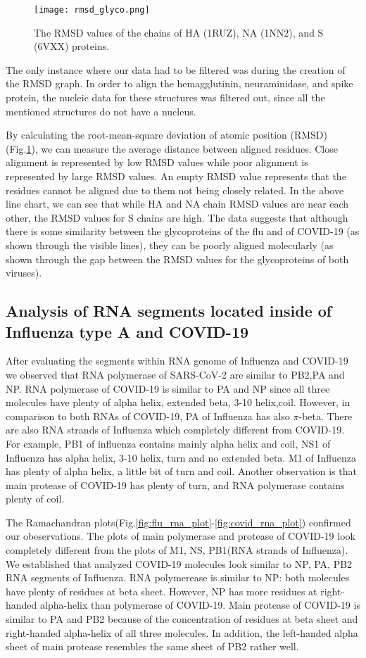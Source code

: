 \documentclass[conference]{IEEEtran}
\begin{document}
\begin{figure}[htbp]
    \centerline{\texttt{[image: rmsd\_glyco.png]}}
\caption{The RMSD values of the chains of HA (1RUZ), NA (1NN2), and S (6VXX) proteins.}
\label{fig:rmsd_glyco}
\end{figure}

The only instance where our data had to be filtered was during the creation of the RMSD graph. In order to align the hemagglutinin, neuraminidase, and spike protein, the nucleic data for these structures was filtered out, since all the mentioned structures do not have a nucleus.


By calculating the root-mean-square deviation of atomic position (RMSD) (Fig.\ref{fig:rmsd_glyco}), we can measure the average distance between aligned residues. Close alignment is represented by low RMSD values while poor alignment is represented by large RMSD values. An empty RMSD value represents that the residues cannot be aligned due to them not being closely related. In the above line chart, we can see that while HA and NA chain RMSD values are near each other, the RMSD values for S chains are high. The data suggests that although there is some similarity between the glycoproteins of the flu and of COVID-19 (as shown through the visible lines), they can be poorly aligned molecularly (as shown through the gap between the RMSD values for the glycoproteins of both viruses).

\subsection{Analysis of RNA segments located inside of Influenza type A and COVID-19}
After evaluating the segments within RNA genome of Influenza and COVID-19 we observed that  RNA polymerase of SARS-CoV-2 are similar to PB2,PA and NP. RNA polymerase of COVID-19 is similar to PA and NP since all three molecules have plenty of alpha helix, extended beta, 3-10 helix,coil. However, in comparison to both RNAs of COVID-19, PA of Influenza has also $\pi$-beta.   
There are also RNA strands of Influenza which completely different from COVID-19. For example, PB1 of influenza contains mainly alpha helix and coil, NS1 of Influenza has alpha helix, 3-10 helix, turn and no extended beta. M1 of Influenza has plenty of alpha helix, a little bit of turn and coil.
Another observation is that main protease of COVID-19 has plenty of turn, and RNA polymerase contains plenty of coil.

The Ramachandran plots(Fig.\ref{fig:flu_rna_plot}-\ref{fig:covid_rna_plot}) confirmed our obeservations. The plots of main polymerase and protease of COVID-19 look completely different from the plots of M1, NS, PB1(RNA strands of Influenza).
We established that analyzed COVID-19 molecules look similar to NP, PA, PB2 RNA segments of Influenza. RNA polymerease is similar to NP: both molecules have plenty of residues at beta sheet. However, NP has more residues at right-handed alpha-helix than polymerase of COVID-19. Main protease of COVID-19 is similar to PA and PB2 because of the concentration of residues at beta sheet and right-handed alpha-helix of all three molecules. In addition, the left-handed alpha sheet of main protease resembles the same sheet of PB2 rather well.
\end{document}
